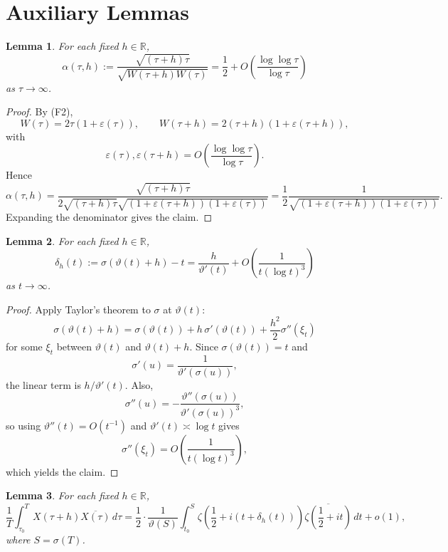 \documentclass[11pt]{article}
\theoremstyle{plain}
\newtheorem{lemma}{Lemma}
\theoremstyle{definition}
\newcommand{\assign}{:=}
\begin{document}
\section{Auxiliary Lemmas}

\begin{lemma}
\label{lem:prefactor}
For each fixed $h\in\mathbb{R}$,
\[
\alpha(\tau,h)\assign
\frac{\sqrt{(\tau+h)\tau}}{\sqrt{W(\tau+h)W(\tau)}}
=
\frac12+O\!\left(\frac{\log\log\tau}{\log\tau}\right)
\]
as $\tau\to\infty$.
\end{lemma}

\begin{proof}
By (F2),
\[
W(\tau)=2\tau(1+\varepsilon(\tau)),
\qquad
W(\tau+h)=2(\tau+h)(1+\varepsilon(\tau+h)),
\]
with
\[
\varepsilon(\tau),\varepsilon(\tau+h)
=
O\!\left(\frac{\log\log\tau}{\log\tau}\right).
\]
Hence
\[
\alpha(\tau,h)
=
\frac{\sqrt{(\tau+h)\tau}}
{2\sqrt{(\tau+h)\tau}\sqrt{(1+\varepsilon(\tau+h))(1+\varepsilon(\tau))}}
=
\frac12\frac{1}{\sqrt{(1+\varepsilon(\tau+h))(1+\varepsilon(\tau))}}.
\]
Expanding the denominator gives the claim.
\end{proof}

\begin{lemma}
\label{lem:delta}
For each fixed $h\in\mathbb{R}$,
\[
\delta_h(t)\assign \sigma(\vartheta(t)+h)-t
=
\frac{h}{\vartheta'(t)}
+
O\!\left(\frac{1}{t(\log t)^3}\right)
\]
as $t\to\infty$.
\end{lemma}

\begin{proof}
Apply Taylor's theorem to $\sigma$ at $\vartheta(t)$:
\[
\sigma(\vartheta(t)+h)
=
\sigma(\vartheta(t))
+
h\,\sigma'(\vartheta(t))
+
\frac{h^2}{2}\sigma''(\xi_t)
\]
for some $\xi_t$ between $\vartheta(t)$ and $\vartheta(t)+h$.
Since $\sigma(\vartheta(t))=t$ and
\[
\sigma'(u)=\frac{1}{\vartheta'(\sigma(u))},
\]
the linear term is $h/\vartheta'(t)$.
Also,
\[
\sigma''(u)
=
-\frac{\vartheta''(\sigma(u))}{\vartheta'(\sigma(u))^3},
\]
so using $\vartheta''(t)=O(t^{-1})$ and $\vartheta'(t)\asymp \log t$ gives
\[
\sigma''(\xi_t)=O\!\left(\frac{1}{t(\log t)^3}\right),
\]
which yields the claim.
\end{proof}

\begin{lemma}
\label{lem:tau-to-t}
For each fixed $h\in\mathbb{R}$,
\[
\frac1T\int_{\tau_0}^T X(\tau+h)\overline{X(\tau)}\,d\tau
=
\frac12\cdot
\frac{1}{\vartheta(S)}
\int_{t_0}^{S}
\zeta\!\left(\frac12+i(t+\delta_h(t))\right)
\overline{\zeta\!\left(\frac12+it\right)}
\,dt
+o(1),
\]
where $S=\sigma(T)$.
\end{lemma}
\end{document}
